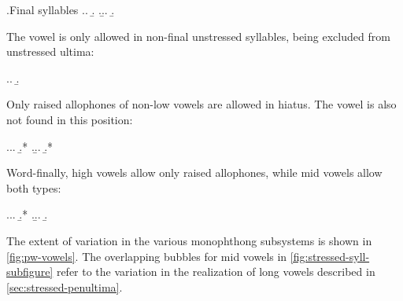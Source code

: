 \ex.Final syllables
\a.\a.
\b.
\z.\b.\a.
\b.

The vowel \ipa{[ə]} is only allowed in non-final unstressed syllables, being excluded from unstressed ultima:

\ex.\a.
\b.

Only  raised allophones of non-low vowels are allowed in hiatus. The vowel \ipa{[ə]} is also not found in this position:

\ex.\a.\a.
\b.*
\z.\b.\a.
\b.*

Word-finally, high vowels allow only raised allophones, while mid vowels allow both types:

\ex.\a.\a.
\b.*
\z.\b.\a.
\b.

The extent of variation in the various monophthong subsystems is shown in \cref{fig:pw-vowels}. The overlapping bubbles for mid vowels in \ref{fig:stressed-syll-subfigure} refer to the variation in the realization of long vowels described in \cref{sec:stressed-penultima}.

